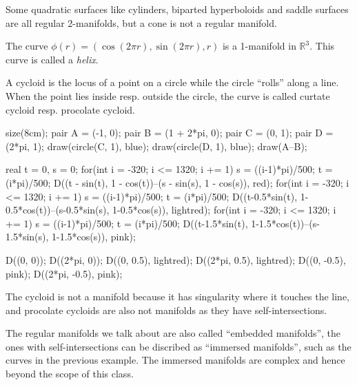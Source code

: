 \begin{example}
    Some quadratic surfaces like cylinders, biparted hyperboloids and saddle surfaces
	are all regular 2-manifolds, but a cone is not a regular manifold.
\end{example}
\begin{example}
    The curve $\phi(r) = (\cos(2\pi r), \sin (2\pi r), r)$ is a 1-manifold in $\mathbb{R}^3$.
	This curve is called a \textit{helix}.
\end{example}
\begin{example}[Cycloid]
    A cycloid is the locus of a point on a circle while the circle ``rolls'' along a line.
	When the point lies inside resp. outside the circle, the curve is called
	curtate cycloid resp. procolate cycloid.

	\begin{center}
	\begin{asy}
		size(8cm);
	    pair A = (-1, 0);
		pair B = (1 + 2*pi, 0);
		pair C = (0, 1);
		pair D = (2*pi, 1);
		draw(circle(C, 1), blue);
		draw(circle(D, 1), blue);
		draw(A--B);

		real t = 0, s = 0;
		for(int i = -320; i <= 1320; i += 1)
		{
			s = ((i-1)*pi)/500;
			t = (i*pi)/500;
			D((t - sin(t), 1 - cos(t))--(s - sin(s), 1 - cos(s)), red);
		}
		for(int i = -320; i <= 1320; i += 1)
		{
			s = ((i-1)*pi)/500;
			t = (i*pi)/500;
			D((t-0.5*sin(t), 1-0.5*cos(t))--(s-0.5*sin(s), 1-0.5*cos(s)), lightred);
		}
		for(int i = -320; i <= 1320; i += 1)
		{
			s = ((i-1)*pi)/500;
			t = (i*pi)/500;
			D((t-1.5*sin(t), 1-1.5*cos(t))--(s-1.5*sin(s), 1-1.5*cos(s)), pink);
		}

		D((0, 0)); D((2*pi, 0));
		D((0, 0.5), lightred); D((2*pi, 0.5), lightred);
		D((0, -0.5), pink); D((2*pi, -0.5), pink);
	\end{asy}
	\end{center}

	The cycloid is not a manifold because it has singularity where it touches the line,
	and procolate cycloids are also not manifolds as they have self-intersections.
\end{example}
\begin{remark}
    The regular manifolds we talk about are also called ``embedded manifolds'',
	the ones with self-intersections can be discribed as ``immersed manifolds'',
	such as the curves in the previous example. The immersed manifolds are complex
	and hence beyond the scope of this class.
\end{remark}

